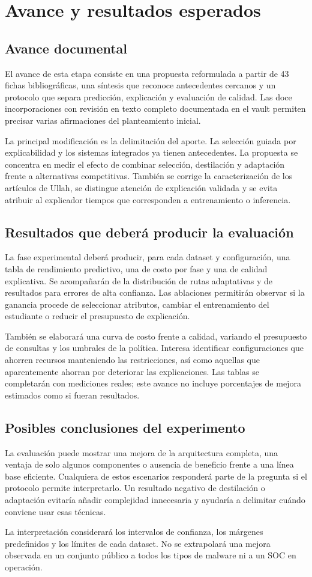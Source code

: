 \chapter{Avance y resultados esperados}
\section{Avance documental}
El avance de esta etapa consiste en una propuesta reformulada a partir de 43 fichas bibliográficas, una síntesis que reconoce antecedentes cercanos y un protocolo que separa predicción, explicación y evaluación de calidad. Las doce incorporaciones con revisión en texto completo documentada en el vault permiten precisar varias afirmaciones del planteamiento inicial.

La principal modificación es la delimitación del aporte. La selección guiada por explicabilidad y los sistemas integrados ya tienen antecedentes. La propuesta se concentra en medir el efecto de combinar selección, destilación y adaptación frente a alternativas competitivas. También se corrige la caracterización de los artículos de Ullah, se distingue atención de explicación validada y se evita atribuir al explicador tiempos que corresponden a entrenamiento o inferencia.

\section{Resultados que deberá producir la evaluación}
La fase experimental deberá producir, para cada dataset y configuración, una tabla de rendimiento predictivo, una de costo por fase y una de calidad explicativa. Se acompañarán de la distribución de rutas adaptativas y de resultados para errores de alta confianza. Las ablaciones permitirán observar si la ganancia procede de seleccionar atributos, cambiar el entrenamiento del estudiante o reducir el presupuesto de explicación.

También se elaborará una curva de costo frente a calidad, variando el presupuesto de consultas y los umbrales de la política. Interesa identificar configuraciones que ahorren recursos manteniendo las restricciones, así como aquellas que aparentemente ahorran por deteriorar las explicaciones. Las tablas se completarán con mediciones reales; este avance no incluye porcentajes de mejora estimados como si fueran resultados.

\section{Posibles conclusiones del experimento}
La evaluación puede mostrar una mejora de la arquitectura completa, una ventaja de solo algunos componentes o ausencia de beneficio frente a una línea base eficiente. Cualquiera de estos escenarios responderá parte de la pregunta si el protocolo permite interpretarlo. Un resultado negativo de destilación o adaptación evitaría añadir complejidad innecesaria y ayudaría a delimitar cuándo conviene usar esas técnicas.

La interpretación considerará los intervalos de confianza, los márgenes predefinidos y los límites de cada dataset. No se extrapolará una mejora observada en un conjunto público a todos los tipos de malware ni a un SOC en operación.
